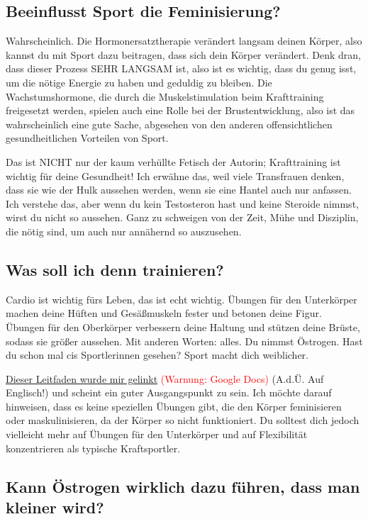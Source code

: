 \documentclass{article}
\begin{document}
{{{\subsection{Beeinflusst Sport die Feminisierung?}

Wahrscheinlich. Die Hormonersatztherapie verändert langsam deinen Körper, also kannst du mit Sport dazu beitragen, dass sich dein Körper verändert. Denk dran, dass dieser Prozess SEHR LANGSAM ist, also ist es wichtig, dass du genug isst, um die nötige Energie zu haben und geduldig zu bleiben. Die Wachstumshormone, die durch die Muskelstimulation beim Krafttraining freigesetzt werden, spielen auch eine Rolle bei der Brustentwicklung, also ist das wahrscheinlich eine gute Sache, abgesehen von den anderen offensichtlichen gesundheitlichen Vorteilen von Sport.

Das ist NICHT nur der kaum verhüllte Fetisch der Autorin; Krafttraining ist wichtig für deine Gesundheit! Ich erwähne das, weil viele Transfrauen denken, dass sie wie der Hulk aussehen werden, wenn sie eine Hantel auch nur anfassen. Ich verstehe das, aber wenn du kein Testosteron hast und keine Steroide nimmst, wirst du nicht so aussehen. Ganz zu schweigen von der Zeit, Mühe und Disziplin, die nötig sind, um auch nur annähernd so auszusehen.

\subsection{Was soll ich denn trainieren?}\label{11-16}

Cardio ist wichtig fürs Leben, das ist echt wichtig. Übungen für den Unterkörper machen deine Hüften und Gesäßmuskeln fester und betonen deine Figur. Übungen für den Oberkörper verbessern deine Haltung und stützen deine Brüste, sodass sie größer aussehen. Mit anderen Worten: alles. Du nimmst Östrogen. Hast du schon mal cis Sportlerinnen gesehen? Sport macht dich weiblicher.

\href{https://docs.google.com/document/d/1-NyE5EY5TTaRRMhk7HlTbKJ7HifjEsA4jlDO1qKQVl0/edit?tab=t.0}{Dieser Leitfaden wurde mir gelinkt} \textcolor{red}{(Warnung: Google Docs)} (A.d.Ü. Auf Englisch!) und scheint ein guter Ausgangspunkt zu sein. Ich möchte darauf hinweisen, dass es keine speziellen Übungen gibt, die den Körper feminisieren oder maskulinisieren, da der Körper so nicht funktioniert. Du solltest dich jedoch vielleicht mehr auf Übungen für den Unterkörper und auf Flexibilität konzentrieren als typische Kraftsportler.

\subsection{Kann Östrogen wirklich dazu führen, dass man kleiner wird?}

}}}
\end{document}
